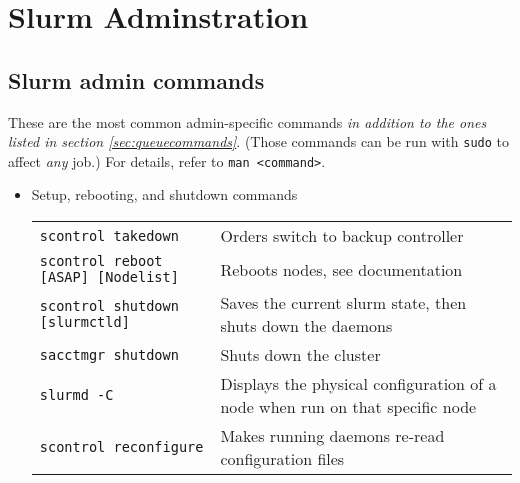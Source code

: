 \chapter{Slurm Adminstration} \label{ch:slurmAdministration}

\section{Slurm admin commands} \label{sec:slurmadmin}
These are the most common admin-specific commands \emph{in addition to the ones listed in section \ref{sec:queuecommands}}. (Those commands can be run with \texttt{sudo} to affect \emph{any} job.) For details, refer to \texttt{man <command>}.

\begin{itemize}
\item Setup, rebooting, and shutdown commands \\
\begin{tabular}{l p{3.4in}}
  \texttt{scontrol takedown}                 & Orders switch to backup controller \\
  \texttt{scontrol reboot [ASAP] [Nodelist]} & Reboots nodes, see documentation \\
  \texttt{scontrol shutdown [slurmctld]}     & Saves the current slurm state, then shuts down the daemons \\
  \texttt{sacctmgr shutdown}                 & Shuts down the cluster \\
  \texttt{slurmd -C}                         & Displays the physical configuration of a node when run on that specific node \\
  \texttt{scontrol reconfigure}              & Makes running daemons re-read configuration files \\
\end{tabular}


\end{itemize}

